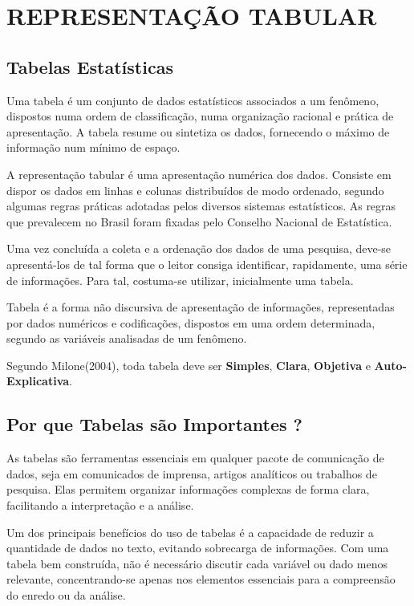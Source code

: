 \chapter{REPRESENTAÇÃO TABULAR}
\section{Tabelas Estatísticas}

Uma tabela é um conjunto de dados estatísticos associados a um fenômeno, dispostos numa ordem de classificação, numa organização racional e prática de apresentação. A tabela resume ou sintetiza os dados, fornecendo o máximo de informação num mínimo de espaço.\vskip0.3cm

A representação tabular é uma apresentação numérica dos dados. Consiste em dispor os dados em linhas e colunas distribuídos de modo ordenado, segundo algumas regras práticas adotadas pelos diversos sistemas estatísticos. As regras que prevalecem no Brasil foram fixadas pelo Conselho Nacional de Estatística.\vskip0.3cm

Uma vez concluída a coleta e a ordenação dos dados de uma pesquisa, deve-se apresentá-los de tal forma que o leitor consiga identificar, rapidamente, uma série de informações. Para tal, costuma-se utilizar, inicialmente uma tabela.\vskip0.3cm

Tabela é a forma não discursiva de apresentação de informações, representadas por dados numéricos e codificações, dispostos em uma ordem determinada, segundo as variáveis analisadas de um fenômeno.\vskip0.3cm

Segundo Milone(2004), toda tabela deve ser \textbf{Simples}, \textbf{Clara}, \textbf{Objetiva} e \textbf{Auto-Explicativa}.

\newpage
\section{Por que Tabelas são Importantes ?}

As tabelas são ferramentas essenciais em qualquer pacote de comunicação de dados, seja em comunicados de imprensa, artigos analíticos ou trabalhos de pesquisa. Elas permitem organizar informações complexas de forma clara, facilitando a interpretação e a análise.\vskip0.3cm

Um dos principais benefícios do uso de tabelas é a capacidade de reduzir a quantidade de dados no texto, evitando sobrecarga de informações. Com uma tabela bem construída, não é necessário discutir cada variável ou dado menos relevante, concentrando-se apenas nos elementos essenciais para a compreensão do enredo ou da análise.\vskip0.3cm

